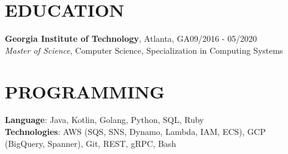 \documentclass[margin,11pt]{res}
\begin{document}
\begin{resume}
\section{EDUCATION}
\textbf{Georgia Institute of Technology}, Atlanta, GA\hfill 09/2016 - 05/2020\\
{\sl Master of Science}, Computer Science, Specialization in Computing Systems\\



\section{PROGRAMMING}

\textbf{Language}: Java, Kotlin, Golang, Python, SQL, Ruby\\
\textbf{Technologies}: AWS (SQS, SNS, Dynamo, Lambda, IAM, ECS), GCP (BigQuery, Spanner), Git, REST, gRPC, Bash\\

\end{resume}
\end{document}
